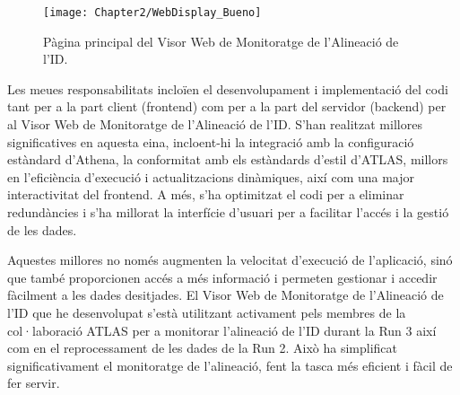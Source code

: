 \begin{figure}[h]
	\centering
  	\texttt{[image: Chapter2/WebDisplay\_Bueno]}
	\caption{Pàgina principal del Visor Web de Monitoratge de l'Alineació de l'ID.}
	\label{fig:Resum:Alignment:WebDisplay} 	
\end{figure}


Les meues responsabilitats incloïen el desenvolupament i implementació del codi tant per a la part client 
(frontend) com per a la part del servidor (backend) per al Visor Web de Monitoratge de l'Alineació de l'ID.
S'han realitzat millores significatives en aquesta eina, incloent-hi la integració amb la configuració estàndard 
d'Athena, la conformitat amb els estàndards d'estil d'ATLAS, millors en l'eficiència d'execució i actualitzacions
dinàmiques, així com una major interactivitat del frontend.
A més, s'ha optimitzat el codi per a eliminar redundàncies i s'ha millorat la interfície d'usuari per a facilitar 
l'accés i la gestió de les dades.

Aquestes millores no només augmenten la velocitat d'execució de l'aplicació, sinó que també proporcionen 
accés a més informació i permeten gestionar i accedir fàcilment a les dades desitjades. El Visor Web de 
Monitoratge de l'Alineació de l'ID que he desenvolupat s'està utilitzant activament pels membres de la 
col·laboració ATLAS per a monitorar l'alineació de l'ID durant la Run 3 així com en el reprocessament de les 
dades de la Run 2. Això ha simplificat significativament el monitoratge de l'alineació, fent la tasca més eficient 
i fàcil de fer servir.



